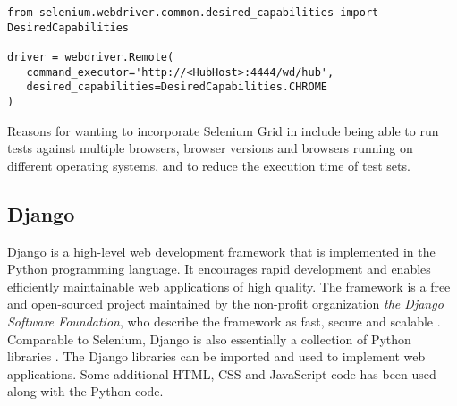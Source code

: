 \vspace{4mm}
\noindent\begin{minipage}{\textwidth}
\begin{lstlisting}[caption=Selenium Test Script WebDriver Instantiation for Remote Execution, label={listing.selWebDriverRemoteEx}]
from selenium.webdriver.common.desired_capabilities import DesiredCapabilities

driver = webdriver.Remote(
   command_executor='http://<HubHost>:4444/wd/hub',
   desired_capabilities=DesiredCapabilities.CHROME
)
\end{lstlisting}
\end{minipage}

Reasons for wanting to incorporate Selenium Grid in \toolname \space include being able to run tests against multiple browsers, browser versions and browsers running on different operating systems, and to reduce the execution time of test sets.

    \iffalse
        selenium web browser automation (collection of Python libraries)
        selenium server?
        selenium grid
    \fi

\subsection{Django}\label{subsection.django} %
Django is a high-level web development framework that is implemented in the Python programming language. It encourages rapid development and enables efficiently maintainable web applications of high quality. The framework is a free and open-sourced project maintained by the non-profit organization \emph{the Django Software Foundation}, who describe the framework as fast, secure and scalable \cite{djangoproject}. Comparable to Selenium, Django is also essentially a collection of Python libraries \cite{thedjangobook}. The Django libraries can be imported and used to implement web applications. Some additional HTML, CSS and JavaScript code has been used along with the Python code.

